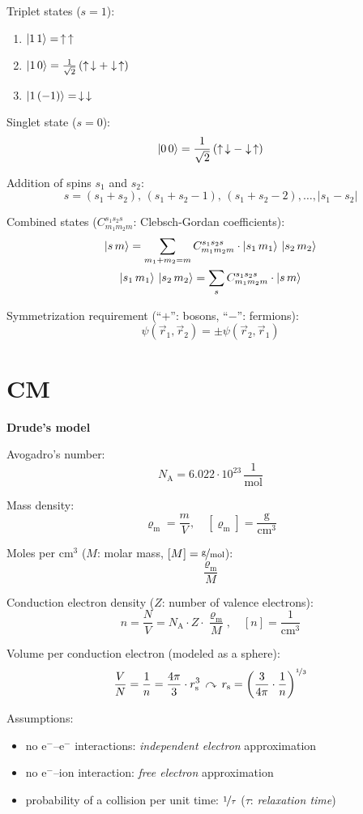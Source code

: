 \documentclass[fontsize=11pt,a4paper]{scrartcl}
\begin{document}
Triplet states ($s=1$):
\begin{enumerate}
	\item $\ket{1\,1} = \,\uparrow\,\uparrow$
	\item $\ket{1\,0} = \frac{1}{\sqrt{2}}\left(\uparrow\,\downarrow+\downarrow\,\uparrow\right)$
	\item $\ket{1\,(-1)} = \,\downarrow\,\downarrow$
\end{enumerate}

Singlet state ($s=0$):
\[
	\ket{0\,0} = \frac{1}{\sqrt{2}}\left(\uparrow\,\downarrow-\downarrow\,\uparrow\right)
\]

Addition of spins $s_1$ and $s_2$:
\[
	s=(s_1+s_2),\,(s_1+s_2-1),\,(s_1+s_2-2),\dots,|s_1-s_2|
\]

Combined states ($C_{m_1 m_2 m}^{s_1 s_2 s}$: Clebsch-Gordan coefficients):
\begin{gather*}
	\ket{s\,m}=\sum_{m_1+m_2=m} C_{m_1 m_2 m}^{s_1 s_2 s}\cdot\ket{s_1\,m_1}\,\ket{s_2\,m_2}\\
	\ket{s_1\,m_1}\,\ket{s_2\,m_2}=\sum_s C_{m_1 m_2 m}^{s_1 s_2 s}\cdot\ket{s\,m}
\end{gather*}

Symmetrization requirement (``$+$'': bosons, ``$-$'': fermions):
\[
	\psi(\vec r_1,\vec r_2)=\pm\psi(\vec r_2,\vec r_1)
\]
%
%
%
%
%
\section{CM}
\textbf{\Large{Drude's model}}

Avogadro's number:
\[
	N_\mathrm{A}=6.022\cdot 10^{23}\,\frac{1}{\mathrm{mol}}
\]

Mass density:
\[
	\varrho_\mathrm{m}=\frac{m}{V},\quad[\varrho_\mathrm{m}]=\frac{\mathrm{g}}{\mathrm{cm}^3}
\]

Moles per $\mathrm{cm}^3$ ($M$: molar mass, $[M]=\nicefrac{\mathrm{g}}{\mathrm{mol}}$):
\[
	\frac{\varrho_\mathrm{m}}{M}
\]

Conduction electron density ($Z$: number of valence electrons):
\[
	n=\frac{N}{V}=N_\mathrm{A}\cdot Z\cdot\frac{\varrho_\mathrm{m}}{M},\quad[n]=\frac{1}{\mathrm{cm}^3}
\]

Volume per conduction electron (modeled as a sphere):
\[
	\frac{V}{N}=\frac{1}{n}=\frac{4\pi}{3}\cdot r_\mathrm{s}^3\,\curvearrowright\,r_\mathrm{s}=\left(\frac{3}{4\pi}\cdot \frac{1}{n}\right)^{\nicefrac{1}{3}}
\]

Assumptions:
\begin{itemize}
	\item no $\mathrm{e}^-$--$\mathrm{e}^-$ interactions: \emph{independent electron} approximation
	\item no $\mathrm{e}^-$--ion interaction: \emph{free electron} approximation
	\item probability of a collision per unit time: $\nicefrac{1}{\tau}$ ($\tau$: \emph{relaxation time})
\end{itemize}
\end{document}
